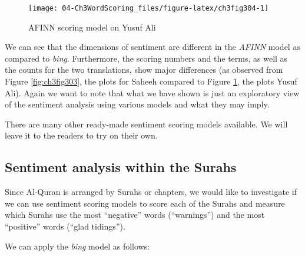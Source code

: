 \documentclass[
]{article}
\begin{document}
\begin{figure}

{\centering \texttt{[image: 04-Ch3WordScoring\_files/figure-latex/ch3fig304-1]} 

}

\caption{AFINN scoring model on Yusuf Ali}\label{fig:ch3fig304}
\end{figure}

We can see that the dimensions of sentiment are different in the \emph{AFINN} model as compared to \emph{bing}. Furthermore, the scoring numbers and the terms, as well as the counts for the two translations, show major differences (as observed from Figure \ref{fig:ch3fig303}, the plots for Saheeh compared to Figure \ref{fig:ch3fig304}, the plots Yusuf Ali). Again we want to note that what we have shown is just an exploratory view of the sentiment analysis using various models and what they may imply.

There are many other ready-made sentiment scoring models available. We will leave it to the readers to try on their own.

\hypertarget{sentiment-analysis-within-the-surahs}{%
\subsection{Sentiment analysis within the Surahs}\label{sentiment-analysis-within-the-surahs}}

Since Al-Quran is arranged by Surahs or chapters, we would like to investigate if we can use sentiment scoring models to score each of the Surahs and measure which Surahs use the most ``negative'' words (``warnings'') and the most ``positive'' words (``glad tidings'').

We can apply the \emph{bing} model as follows:
\end{document}
